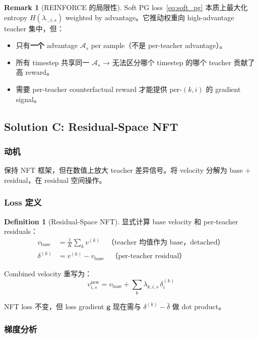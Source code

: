 \documentclass[11pt,a4paper]{article}
\newcommand{\adv}{\mathcal{A}}
\theoremstyle{definition}
\newtheorem{definition}{Definition}
\newtheorem{remark}{Remark}
\begin{document}
\begin{remark}[REINFORCE 的局限性]
Soft PG loss~\eqref{eq:soft_pg} 本质上最大化 entropy $H(\lambda_{:,i,s})$ weighted by advantage。它推动权重向 high-advantage teacher 集中，但：
\begin{itemize}[leftmargin=1em]
\item 只有\textbf{一个} advantage $\adv_s$ per sample（不是 per-teacher advantage）。
\item 所有 timestep 共享同一 $\adv_s$ → 无法区分哪个 timestep 的哪个 teacher 贡献了高 reward。
\item 需要 per-teacher counterfactual reward 才能提供 per-$(k,i)$ 的 gradient signal。
\end{itemize}
\end{remark}

\subsection{Solution C: Residual-Space NFT}

\subsubsection{动机}
保持 NFT 框架，但在数值上放大 teacher 差异信号。将 velocity 分解为 base + residual，在 residual 空间操作。

\subsubsection{Loss 定义}

\begin{definition}[Residual-Space NFT]
显式计算 base velocity 和 per-teacher residuals：
\begin{align}
v_{\mathrm{base}} &= \frac{1}{K}\sum_k v^{(k)} \quad\text{（teacher 均值作为 base，detached）} \\
\delta^{(k)} &= v^{(k)} - v_{\mathrm{base}} \quad\text{（per-teacher residual）}
\end{align}

Combined velocity 重写为：
\begin{equation}
v^{\mathrm{new}}_{i,s} = v_{\mathrm{base}} + \sum_k \lambda_{k,i,s}\, \delta^{(k)}_i
\end{equation}

NFT loss 不变，但 loss gradient $\mathbf{g}$ 现在需与 $\delta^{(k)} - \bar{\delta}$ 做 dot product。
\end{definition}

\subsubsection{梯度分析}
\end{document}
